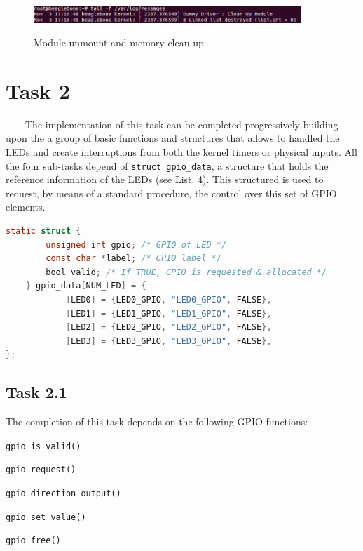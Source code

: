\documentclass[letterpaper,12pt] {article}
\begin{document}
\begin{figure}[H]
	\centering
	\includegraphics[width=0.9\textwidth]{task1-releas}\\
	\caption{Module unmount and memory clean up}
	\label{task1-r}
\end{figure}



\section*{Task 2}
\ \ \ \
The implementation of this task can be completed progressively building upon the a group of basic functions and structures that allows to handled the  LEDs and create interruptions from both the kernel timers or physical inputs. All the four sub-tasks depend of \texttt{struct gpio\_data}, a structure that holds the reference information of the LEDs (see List. 4). This structured is used to request, by means of a standard procedure, the control over this set of GPIO elements.\\
  
\begin{lstlisting}[firstnumber = 41 ,language=C , caption =  GPIO LED structure for signal mapping  ]
static struct {
		unsigned int gpio; /* GPIO of LED */
		const char *label; /* GPIO label */
		bool valid; /* If TRUE, GPIO is requested & allocated */
	} gpio_data[NUM_LED] = {
			[LED0] = {LED0_GPIO, "LED0_GPIO", FALSE},
			[LED1] = {LED1_GPIO, "LED1_GPIO", FALSE},
			[LED2] = {LED2_GPIO, "LED2_GPIO", FALSE},
			[LED3] = {LED3_GPIO, "LED3_GPIO", FALSE},
};
\end{lstlisting}



\subsection*{Task 2.1} 

The completion of this task depends on the following GPIO functions:

\begin{list}{}{}
	\item \texttt{gpio\_is\_valid()}
	\item \texttt{gpio\_request()}
	\item \texttt{gpio\_direction\_output()}
	\item \texttt{gpio\_set\_value()}
	\item \texttt{gpio\_free()}
\end{list}  
\end{document}
